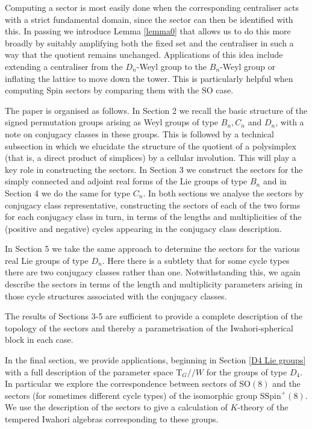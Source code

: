 \documentclass[11pt,a4paper]{article}
\def\SSpin{\mathrm{SSpin}}
\def\Spin{\mathrm{Spin}}
\def\SO{\mathrm{SO}}
\def\SSpin{\mathrm{SSpin}}
\def\q {{/\!/}}
\def\bT{\mathrm{T}}
\begin{document}
Computing a sector is most easily done when the corresponding centraliser acts with a strict fundamental domain, since the sector can then be identified with this. In passing we introduce Lemma \ref{lemma0} that allows us to do this more broadly by suitably amplifying both the fixed set and the centraliser in such a way that the quotient remains unchanged. 
Applications of this idea include extending a centraliser from the $D_n$-Weyl group to the $B_n$-Weyl group or inflating the lattice to move down the tower. This is particularly helpful when computing $\Spin$ sectors by comparing them with the $\SO$ case.


The paper is organised as follows. In Section 2 we recall the basic structure of the signed permutation groups arising as 
Weyl groups of type $B_n, C_n$ and $D_n$, with a note on conjugacy classes in these groups. This is followed by a technical subsection in which we elucidate the structure of the quotient of a polysimplex (that is, a direct product of simplices) by a cellular involution. This will play a key role in constructing the sectors. In Section 3 we construct the sectors for the simply connected and adjoint real forms of the Lie groups of type $B_n$ and in Section 4 we do the same for type $C_n$. In both sections we analyse the sectors by conjugacy class representative, constructing the sectors of each of the two forms for each conjugacy class in turn, in terms of the lengths and multiplicities of the (positive and negative) cycles appearing in the conjugacy class description. 

In Section 5 we take the same approach to determine the sectors for the various real Lie groups of type $D_n$. Here there is a subtlety that for some cycle types there are two conjugacy classes rather than one.
Notwithstanding this, we again describe the sectors in terms of the length and multiplicity parameters arising in those cycle structures associated with the conjugacy classes. 

The results of Sections 3-5 are sufficient to provide a complete description of the topology of the sectors and thereby a parametrisation of the Iwahori-spherical block in each case. 

In the final section, we provide applications, beginning in Section \ref{D4 Lie groups} with a full description of the parameter space $\bT_G \q W$ for the groups of type $D_4$. In particular we explore the correspondence between sectors of $\SO(8)$ and the sectors (for sometimes different cycle types) of the isomorphic group $\SSpin^+(8)$. We use the description of the sectors to give a calculation of $K$-theory of the tempered Iwahori algebras corresponding to these groups.
\end{document}
